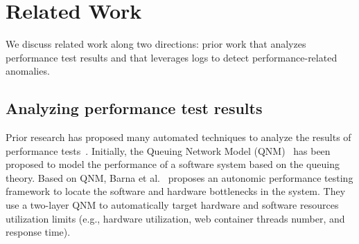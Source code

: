 \section{Related Work} \label{sec:relatedwork}
We discuss related work along two directions: prior work that analyzes performance test results and that leverages logs to detect performance-related anomalies.

\subsection{Analyzing performance test results}
Prior research has proposed many automated techniques to analyze the results of performance tests~\citep{DBLP:conf/icst/GaoJBL16,DBLP:journals/tse/JiangH15}.
Initially, the Queuing Network Model (QNM)~\citep{DBLP:books/daglib/0076254} has been proposed to model the performance of a software system based on the queuing theory. 
Based on QNM, Barna et al.~\citep{DBLP:conf/icac/BarnaLG11} proposes an autonomic performance testing framework to locate the software and hardware bottlenecks in the system. They use a two-layer QNM to automatically target hardware and software resources utilization limits (e.g., hardware utilization, web container threads number, and response time). 

